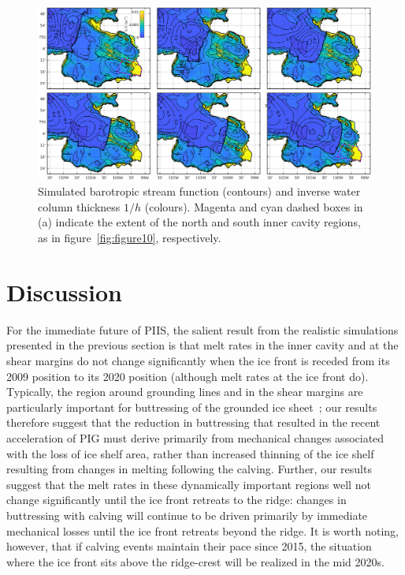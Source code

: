 \documentclass[draft]{agujournal2019}
\begin{document}
\begin{figure}
    \centering
    \includegraphics[width = \textwidth]{../make_figures/plots/figure13.eps}
    \caption{Simulated barotropic stream function (contours) and inverse water column thickness $1/h$ (colours). Magenta and cyan dashed boxes in (a) indicate the extent of the north and south inner cavity regions, as in figure~\ref{fig:figure10}, respectively.} 
    \label{fig:figure13}
\end{figure}

\section{Discussion}\label{S:Discussion}

For the immediate future of PIIS, the salient result from the realistic simulations presented in the previous section is that melt rates in the inner cavity and at the shear margins do not change significantly when the ice front is receded from its 2009 position to its 2020 position (although melt rates at the ice front do). Typically, the region around grounding lines and in the shear margins are particularly important for buttressing of the grounded ice sheet~\cite{Furst2016NatureClimCh, Reese2018NatureClimCh}; our results therefore suggest that the reduction in buttressing that resulted in the recent acceleration of PIG \cite{Joughin2021ScienceAdv} must derive primarily from mechanical changes associated with the loss of ice shelf area, rather than increased thinning of the ice shelf resulting from changes in melting following the calving. Further, our results suggest that the melt rates in these dynamically important regions well not change significantly until the ice front retreats to the ridge: changes in buttressing with calving will continue to be driven primarily by immediate mechanical losses until the ice front retreats beyond the ridge. It is worth noting, however, that if calving events maintain their pace since 2015, the situation where the ice front sits above the ridge-crest will be realized in the mid 2020s.
\end{document}
